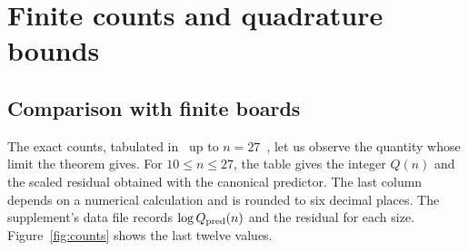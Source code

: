 \section{Finite counts and quadrature bounds}\label{app:numquad}
\subsection{Comparison with finite boards}\label{sec:ajuste-finito}
The exact counts, tabulated in~\cite{oeis} up to $n=27$~\cite{q27}, let us observe the quantity
whose limit the theorem gives. For $10\le n\le27$, the table gives the integer $Q(n)$ and the
scaled residual obtained with the canonical predictor. The last column depends on a numerical
calculation and is rounded to six decimal places. The supplement's data file records $\log Q_{\rm
pred}(n)$ and the residual for each size. Figure~\ref{fig:counts} shows the last twelve values.

